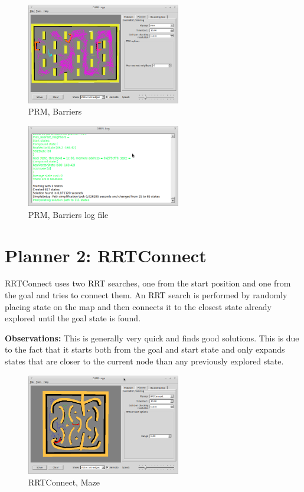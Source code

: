 \documentclass[a4paper]{article}
\begin{document}
\begin{figure}[H]
     \centering
     \includegraphics[width=0.6\textwidth]{prm_barrier.png}
     \caption{PRM, Barriers}
     \label{signals}
\end{figure}

\begin{figure}[H]
     \centering
     \includegraphics[width=0.6\textwidth]{prm_barrier_log.png}
     \caption{PRM, Barriers log file}
     \label{signals}
\end{figure}

\section*{Planner 2: RRTConnect}
RRTConnect uses two RRT searches, one from the start position and one from the goal and tries to connect them. An RRT search is performed by randomly placing state on the map and then connects it to the closest state already explored until the goal state is found. 

\textbf{Observations:}
This is generally very quick and finds good solutions. This is due to the fact that it starts both from the goal and start state and only expands states that are closer to the current node than any previously explored state.

\begin{figure}[H]
     \centering
     \includegraphics[width=0.6\textwidth]{rrtconnect_maze.png}
     \caption{RRTConnect, Maze}
     \label{signals}
\end{figure}
\end{document}
